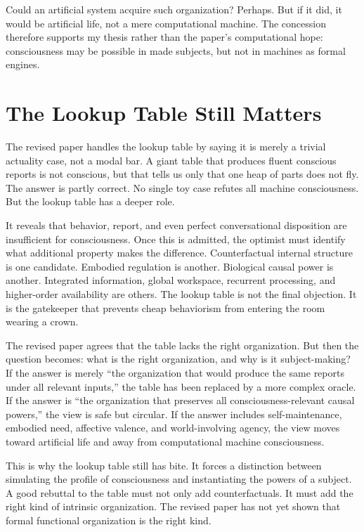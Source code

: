 \documentclass[11pt]{article}
\begin{document}
Could an artificial system acquire such organization? Perhaps. But if it did, it would be artificial life, not a mere computational machine. The concession therefore supports my thesis rather than the paper's computational hope: consciousness may be possible in made subjects, but not in machines as formal engines.

\section{The Lookup Table Still Matters}

The revised paper handles the lookup table by saying it is merely a trivial actuality case, not a modal bar. A giant table that produces fluent conscious reports is not conscious, but that tells us only that one heap of parts does not fly. The answer is partly correct. No single toy case refutes all machine consciousness. But the lookup table has a deeper role.

It reveals that behavior, report, and even perfect conversational disposition are insufficient for consciousness. Once this is admitted, the optimist must identify what additional property makes the difference. Counterfactual internal structure is one candidate. Embodied regulation is another. Biological causal power is another. Integrated information, global workspace, recurrent processing, and higher-order availability are others. The lookup table is not the final objection. It is the gatekeeper that prevents cheap behaviorism from entering the room wearing a crown.

The revised paper agrees that the table lacks the right organization. But then the question becomes: what is the right organization, and why is it subject-making? If the answer is merely ``the organization that would produce the same reports under all relevant inputs,'' the table has been replaced by a more complex oracle. If the answer is ``the organization that preserves all consciousness-relevant causal powers,'' the view is safe but circular. If the answer includes self-maintenance, embodied need, affective valence, and world-involving agency, the view moves toward artificial life and away from computational machine consciousness.

This is why the lookup table still has bite. It forces a distinction between simulating the profile of consciousness and instantiating the powers of a subject. A good rebuttal to the table must not only add counterfactuals. It must add the right kind of intrinsic organization. The revised paper has not yet shown that formal functional organization is the right kind.
\end{document}
